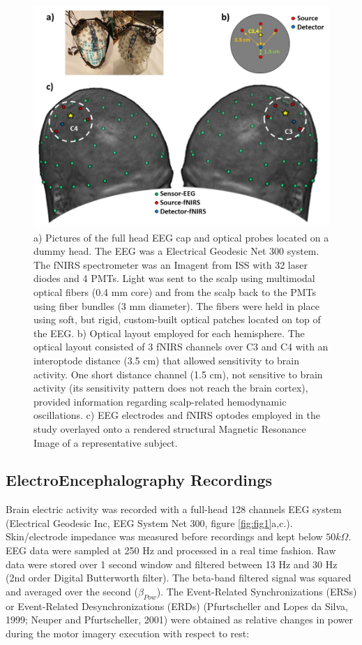 \documentclass[12pt ]{iopart}
\begin{document}
\begin{figure}
	\includegraphics[width=\linewidth]{Slide2.JPG}
	\caption{a) Pictures of the full head EEG cap and optical probes located on a dummy head. The EEG was a Electrical Geodesic Net 300 system. The fNIRS spectrometer was an Imagent from ISS with 32 laser diodes and 4 PMTs. Light was sent to the scalp using multimodal optical fibers (0.4 mm core) and from the scalp back to the PMTs using fiber bundles (3 mm diameter).  The fibers were held in place using soft, but rigid, custom-built optical patches located on top of the EEG. b) Optical layout employed for each hemisphere. The optical layout consisted of 3 fNIRS channels over C3 and C4 with an interoptode distance (3.5 cm) that allowed sensitivity to brain activity. One short distance channel (1.5 cm),  not sensitive to brain activity (its sensitivity pattern does not reach the brain cortex), provided information regarding scalp-related hemodynamic oscillations. c) EEG electrodes and fNIRS optodes employed in the study overlayed onto a rendered structural Magnetic Resonance Image of a representative subject. }
	\label{fig:fig2}
\end{figure}


\subsection{ElectroEncephalography Recordings}
Brain electric activity was recorded with a full-head 128 channels EEG system (Electrical Geodesic Inc, EEG System Net 300, figure \ref{fig:fig1}a,c.).
Skin/electrode impedance was measured before recordings and kept below $50 k\Omega$. EEG data were sampled at 250 Hz and processed in a real time fashion.  Raw data were stored over 1 second window and filtered between 13 Hz and 30 Hz (2nd order Digital Butterworth filter). The beta-band filtered signal was squared and averaged over the second ($\beta_{Pow}$).
 The Event-Related Synchronizations (ERSs) or Event-Related Desynchronizations (ERDs) (Pfurtscheller and Lopes da Silva, 1999; Neuper and Pfurtscheller, 2001) were obtained as relative changes in power during the motor imagery execution with respect to rest:
\end{document}

